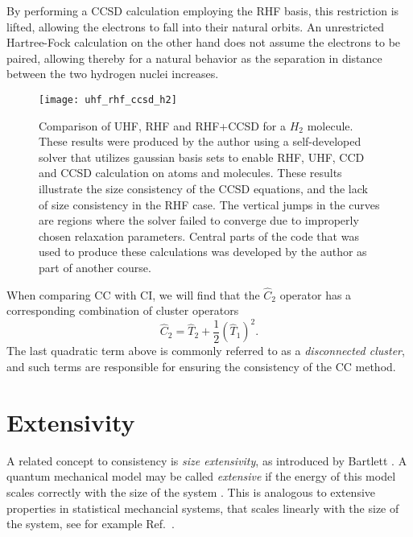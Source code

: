 By performing a CCSD calculation employing  the RHF basis, this restriction is lifted, allowing the
electrons to fall into their natural orbits. An unrestricted Hartree-Fock calculation on the other hand does
not assume the electrons to be paired, allowing thereby for a natural
behavior as the separation in distance between the two hydrogen nuclei increases.


\begin{figure}[hbtp]
    \centering
    \texttt{[image: uhf\_rhf\_ccsd\_h2]}
    \caption{Comparison of UHF, RHF and RHF+CCSD for a $H_2$
      molecule. These results were produced by the author using a self-developed 
      solver \cite{FermionMingle} that utilizes gaussian
      basis sets to enable RHF, UHF, CCD and CCSD calculation on atoms
      and molecules. These results
      illustrate the size consistency of the CCSD equations, and
      the lack of size consistency in the RHF case. The vertical
      jumps in the curves are regions where the solver failed to
      converge due to improperly chosen relaxation parameters. Central parts of the code \cite{FermionMingle} that was used to produce these calculations was developed by the author as part of another course.}
    \label{fig:uhf_rhf_ccsd_h2}
\end{figure}


When comparing CC with CI, we will find that the $\hat{C}_2$ operator
has a corresponding combination of cluster operators
\begin{equation}
\hat{C}_2 = \hat{T}_2 + \frac{1}{2}(\hat{T}_1)^2.
\end{equation} 
The last quadratic term above is commonly referred to as a
\emph{disconnected cluster}, and such terms are responsible for
ensuring the consistency of the CC method.



\section{Extensivity}

A related concept to consistency is \emph{size extensivity}, as
introduced by Bartlett \cite{Bartlett1981}. A quantum mechanical model
may be called \emph{extensive} if the energy of this model scales
correctly with the size of the
system \cite[p.11]{ShavittBartlett2009}. This is analogous to
extensive properties in statistical mechancial systems, that scales
linearly with the size of the system, see for example Ref.~\cite[p.9]{Linder}.

